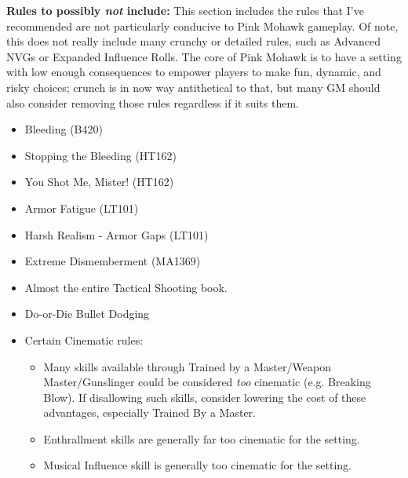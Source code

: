 \begin{multicols*}{2}
	\textbf{Rules to possibly \textit{not} include:}
	This section includes the rules that I've recommended are not particularly conducive to Pink Mohawk gameplay. Of note, this does not really include many crunchy or detailed rules, such as Advanced NVGs or Expanded Influence Rolls. The core of Pink Mohawk is to have a setting with low enough consequences to empower players to make fun, dynamic, and risky choices; crunch is in now way antithetical to that, but many GM should also consider removing those rules regardless if it suits them.
	\begin{itemize}
		\itemsep 0pt
		\item Bleeding (B420)
		\item Stopping the Bleeding (HT162)
		\item You Shot Me, Mister! (HT162)
		\item Armor Fatigue (LT101)
		\item Harsh Realism - Armor Gaps (LT101)
		\item Extreme Dismemberment (MA1369)
		\item Almost the entire Tactical Shooting book.
		\item Do-or-Die Bullet Dodging
		\item Certain Cinematic rules:
		\begin{itemize}
			\itemsep 0pt
			\item Many skills available through Trained by a Master/Weapon Master/Gunslinger could be considered \textit{too} cinematic (e.g. Breaking Blow). If disallowing such skills, consider lowering the cost of these advantages, especially Trained By a Master.
			\item Enthrallment skills are generally far too cinematic for the setting.
			\item Musical Influence skill is generally too cinematic for the setting.
		\end{itemize}
	\end{itemize}
	

\end{multicols*}
